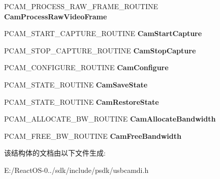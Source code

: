 \begin{DoxyCompactItemize}
P\+C\+A\+M\+\_\+\+P\+R\+O\+C\+E\+S\+S\+\_\+\+R\+A\+W\+\_\+\+F\+R\+A\+M\+E\+\_\+\+R\+O\+U\+T\+I\+NE {\bfseries Cam\+Process\+Raw\+Video\+Frame}
\item 
\mbox{\label{struct___u_s_b_c_a_m_d___d_e_v_i_c_e___d_a_t_a_a16fc4e89f2dadb4ffbf1512e5c06d1f3}} 
P\+C\+A\+M\+\_\+\+S\+T\+A\+R\+T\+\_\+\+C\+A\+P\+T\+U\+R\+E\+\_\+\+R\+O\+U\+T\+I\+NE {\bfseries Cam\+Start\+Capture}
\item 
\mbox{\label{struct___u_s_b_c_a_m_d___d_e_v_i_c_e___d_a_t_a_a6997d8b3299809f2d250e23f04d05d12}} 
P\+C\+A\+M\+\_\+\+S\+T\+O\+P\+\_\+\+C\+A\+P\+T\+U\+R\+E\+\_\+\+R\+O\+U\+T\+I\+NE {\bfseries Cam\+Stop\+Capture}
\item 
\mbox{\label{struct___u_s_b_c_a_m_d___d_e_v_i_c_e___d_a_t_a_ad00ea41223f78d9db9dfb9a3ac34fd3d}} 
P\+C\+A\+M\+\_\+\+C\+O\+N\+F\+I\+G\+U\+R\+E\+\_\+\+R\+O\+U\+T\+I\+NE {\bfseries Cam\+Configure}
\item 
\mbox{\label{struct___u_s_b_c_a_m_d___d_e_v_i_c_e___d_a_t_a_a11c1db133bc8b166d13adf0544524328}} 
P\+C\+A\+M\+\_\+\+S\+T\+A\+T\+E\+\_\+\+R\+O\+U\+T\+I\+NE {\bfseries Cam\+Save\+State}
\item 
\mbox{\label{struct___u_s_b_c_a_m_d___d_e_v_i_c_e___d_a_t_a_a34a636ddb02a8aa4be5f69bc0ceaa906}} 
P\+C\+A\+M\+\_\+\+S\+T\+A\+T\+E\+\_\+\+R\+O\+U\+T\+I\+NE {\bfseries Cam\+Restore\+State}
\item 
\mbox{\label{struct___u_s_b_c_a_m_d___d_e_v_i_c_e___d_a_t_a_ae3f5fc2f48a77a5835068ac99677ba9a}} 
P\+C\+A\+M\+\_\+\+A\+L\+L\+O\+C\+A\+T\+E\+\_\+\+B\+W\+\_\+\+R\+O\+U\+T\+I\+NE {\bfseries Cam\+Allocate\+Bandwidth}
\item 
\mbox{\label{struct___u_s_b_c_a_m_d___d_e_v_i_c_e___d_a_t_a_aac4acc3423d7462142a5cb1fb42e590b}} 
P\+C\+A\+M\+\_\+\+F\+R\+E\+E\+\_\+\+B\+W\+\_\+\+R\+O\+U\+T\+I\+NE {\bfseries Cam\+Free\+Bandwidth}
\end{DoxyCompactItemize}


该结构体的文档由以下文件生成\+:\begin{DoxyCompactItemize}
\item 
E\+:/\+React\+O\+S-\/0../sdk/include/psdk/usbcamdi.\+h\end{DoxyCompactItemize}
